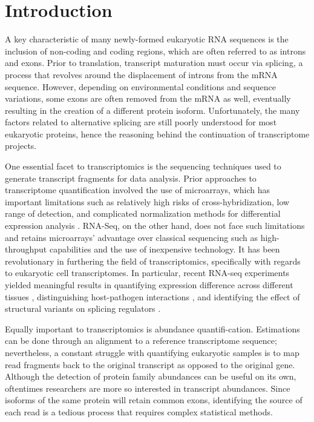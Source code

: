 \section{Introduction}

A key characteristic of many newly-formed eukaryotic RNA sequences is the inclusion of non-coding and coding regions, 
which are often referred to as introns and exons. Prior to translation, transcript maturation must occur via splicing, 
a process that revolves around the displacement of introns from the mRNA sequence. However, depending on environmental 
conditions and sequence variations, some exons are often removed from the mRNA as well, eventually resulting in the creation of 
a different protein isoform. Unfortunately, the many factors related to alternative splicing are still poorly understood for most 
eukaryotic proteins, hence the reasoning behind the continuation of transcriptome projects.

One essential facet to transcriptomics is the sequencing techniques used to generate transcript fragments for data analysis. 
Prior approaches to transcriptome quantification involved the use of microarrays, which has important limitations such as relatively high 
risks of cross-hybridization, low range of detection, and complicated normalization methods for differential expression analysis 
\cite{Wang_Gerstein_Snyder_2009}. 
RNA-Seq, on the other hand, does not face such limitations and retains microarrays’ advantage over classical sequencing such as 
high-throughput capabilities and the use of inexpensive technology. It has been revolutionary in furthering the field of transcriptomics,
specifically with regards to eukaryotic cell transcriptomes. In particular, recent RNA-seq experiments yielded meaningful results in 
quantifying expression difference across different tissues \cite{Glinos_et_al._2022}, distinguishing host-pathogen interactions 
\cite{Pisu_Huang_Grenier_Russell_2020}, 
and identifying the effect of structural variants on splicing regulators \cite{Pascal_et_al._2023}. 

Equally important to transcriptomics is abundance quantifi-cation. Estimations can be done through an alignment to a 
reference transcriptome sequence; nevertheless, a constant struggle with quantifying eukaryotic samples is to map read 
fragments back to the original transcript as opposed to the original gene. Although the detection of protein family abundances 
can be useful on its own, oftentimes researchers are more so interested in transcript abundances. Since isoforms of the same 
protein will retain common exons, identifying the source of each read is a tedious process that requires 
complex statistical methods.

